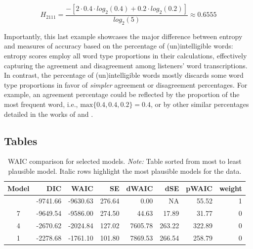 \documentclass[
  authoryear,
  preprint,
  1p]{elsarticle}
\begin{document}
\[
H_{2111} = \frac{ -\left[ 2 \cdot 0.4 \cdot log_{2}(0.4) + 0.2 \cdot log_{2}(0.2) \right] }{ log_{2}(5)} \approx 0.6555
\]

{Importantly, this last example showcases the major difference between
entropy and measures of accuracy based on the percentage of
(un)intelligible words: entropy scores employ all word type proportions
in their calculations, effectively capturing the agreement and
disagreement among listeners' word transcriptions. In contrast, the
percentage of (un)intelligible words mostly discards some word type
proportions in favor of \emph{simpler} agreement or disagreement
percentages. For example, an agreement percentage could be reflected by
the proportion of the most frequent word, i.e.,
\(\text{max}\{ 0.4, 0.4, 0.2 \}=0.4\), or by other similar percentages
detailed in the works of \citet{Flipsen_2006} and
\citet{Lagerberg_et_al_2014}.}

\newpage{}

\subsection{Tables}\label{sec-appB}

\begin{longtable}[]{@{}crrrrrrr@{}}

\caption{\label{tbl-rq1-waic}WAIC comparison for selected models.
\emph{Note:} Table sorted from most to least plausible model. Italic
rows highlight the most plausible models for the data.}

\tabularnewline

\toprule\noalign{}
Model & DIC & WAIC & SE & dWAIC & dSE & pWAIC & weight \\
\midrule\noalign{}
\endhead
\bottomrule\noalign{}
\endlastfoot
10 & -9741.66 & -9630.63 & 276.64 & 0.00 & NA & 55.52 & 1 \\
7 & -9649.54 & -9586.00 & 274.50 & 44.63 & 17.89 & 31.77 & 0 \\
4 & -2670.62 & -2024.84 & 127.02 & 7605.78 & 263.22 & 322.89 & 0 \\
1 & -2278.68 & -1761.10 & 101.80 & 7869.53 & 266.54 & 258.79 & 0 \\

\end{longtable}
\end{document}
